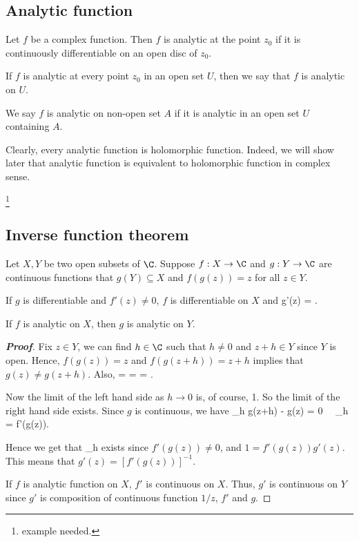 \subsection{Analytic function}

\begin{definition}
Let $f$ be a complex function. Then $f$ is analytic at the point $z_0$ if it is continuously differentiable on an open disc of $z_0$.

If $f$ is analytic at every point $z_0$ in an open set $U$, then we say that $f$ is analytic on $U$.

We say $f$ is analytic on non-open set $A$ if it is analytic in an open set $U$ containing $A$.
\end{definition}

\begin{remark}
Clearly, every analytic function is holomorphic function. Indeed, we will show later that analytic function is equivalent to holomorphic function in complex sense.
\end{remark}

\footnote{example needed.}

\subsection{Inverse function theorem}

\begin{theorem}
Let $X,Y$ be two open subsets of $\C$. Suppose $f:X\to \C$ and $g:Y\to \C$ are continuous functions that $g(Y)\subseteq X$ and $f(g(z)) = z$ for all $z\in Y$.

If $g$ is differentiable and $f'(z) \neq 0$, $f$ is differentiable on $X$ and
\be
g'(z) = .
\ee

If $f$ is analytic on $X$, then $g$ is analytic on $Y$.
\end{theorem}

\begin{proof}[\bf Proof]
Fix $z\in Y$, we can find $h\in \C$ such that $h\neq 0$ and $z+h\in Y$ since $Y$ is open. Hence, $f(g(z)) = z$ and $f(g(z+h)) = z+h$ implies that $g(z)\neq g(z+h)$. Also,
 = =  =  \cdot {}.
\ee

Now the limit of the left hand side as $h\to 0$ is, of course, 1. So the limit of the right hand side exists. Since $g$ is continuous, we have
\be
\lim_{h} g(z+h) - g(z) = 0 \ \ra\ \lim_{h}  = f'(g(z)).
\ee

Hence we get that
\be
\lim_{h} 
\ee
exists since $f'(g(z)) \neq 0$, and $1 = f'(g(z)) g'(z)$. This means that $g'(z) = [f'(g(z))]^{-1}$.

If $f$ is analytic function on $X$, $f'$ is continuous on $X$. Thus, $g'$ is continuous on $Y$ since $g'$ is composition of continuous function $1/z$, $f'$ and $g$.
\end{proof}

